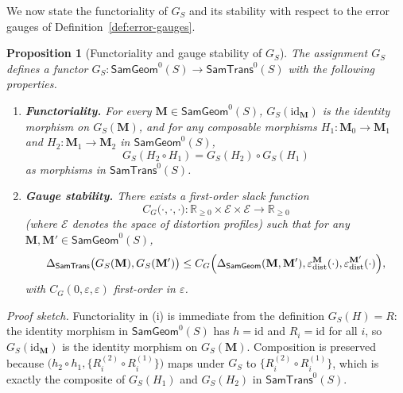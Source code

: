 \documentclass[11pt]{article}
\newcommand{\RR}{\mathbb{R}}
\newtheorem{proposition}{Proposition}
\newcommand{\SamTrans}{\mathsf{SamTrans}}
\newcommand{\SamGeom}{\mathsf{SamGeom}}
\begin{document}
We now state the functoriality of $G_S$ and its stability with respect to the
error gauges of Definition~\ref{def:error-gauges}.

\begin{proposition}[Functoriality and gauge stability of $G_S$]
\label{prop:G-functor}
The assignment $G_S$ defines a functor
$G_S : \SamGeom^0(S) \to \SamTrans^0(S)$ with the following properties.
\begin{enumerate}[label=(\roman*),leftmargin=*]

\item \textbf{Functoriality.}
For every $\mathbf{M} \in \SamGeom^0(S)$, $G_S(\mathrm{id}_{\mathbf{M}})$ is
the identity morphism on $G_S(\mathbf{M})$, and for any composable morphisms
$H_1 : \mathbf{M}_0 \to \mathbf{M}_1$ and
$H_2 : \mathbf{M}_1 \to \mathbf{M}_2$ in $\SamGeom^0(S)$,
\[
G_S(H_2 \circ H_1) = G_S(H_2) \circ G_S(H_1)
\]
as morphisms in $\SamTrans^0(S)$.

\item \textbf{Gauge stability.}
There exists a first-order slack function
\[
C_G\bigl(
\cdot,\cdot,\cdot
\bigr)
:
\RR_{\ge 0} \times \mathcal{E} \times \mathcal{E} \to \RR_{\ge 0}
\]
(where $\mathcal{E}$ denotes the space of distortion profiles) such that for
any $\mathbf{M},\mathbf{M}' \in \SamGeom^0(S)$,
\begin{equation}
\label{eq:G-gauge-stability}
\Delta_{\SamTrans}\bigl(G_S(\mathbf{M}), G_S(\mathbf{M}')\bigr)
\le
C_G\Bigl(
\Delta_{\SamGeom}(\mathbf{M}, \mathbf{M}'),
\varepsilon_{\mathrm{dist}}^{\mathbf{M}}(\cdot),
\varepsilon_{\mathrm{dist}}^{\mathbf{M}'}(\cdot)
\Bigr),
\end{equation}
with $C_G(0,\varepsilon,\varepsilon)$ first-order in $\varepsilon$.

\end{enumerate}
\end{proposition}

\emph{Proof sketch.}
Functoriality in (i) is immediate from the definition
$G_S(H) = R$: the identity morphism in $\SamGeom^0(S)$ has $h=\mathrm{id}$
and $R_i=\mathrm{id}$ for all $i$, so $G_S(\mathrm{id}_{\mathbf{M}})$ is the
identity morphism on $G_S(\mathbf{M})$. Composition is preserved because
$\bigl(h_2\circ h_1,\{R_i^{(2)}\circ R_i^{(1)}\}\bigr)$ maps under $G_S$ to
$\{R_i^{(2)}\circ R_i^{(1)}\}$, which is exactly the composite of
$G_S(H_1)$ and $G_S(H_2)$ in $\SamTrans^0(S)$.
\end{document}
